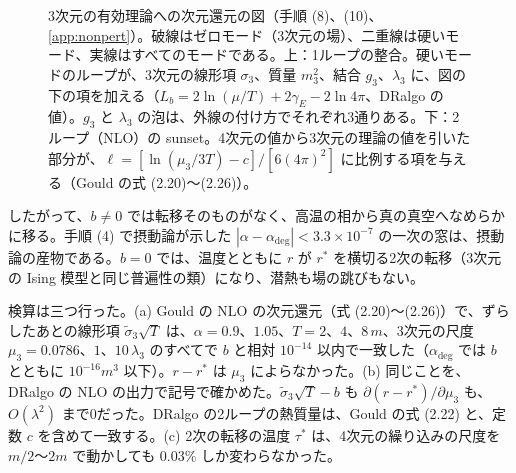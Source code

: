 \documentclass[a4paper,10pt]{ltjsarticle}
\begin{document}
\begin{figure}[tbp]
\caption{3次元の有効理論への次元還元の図（手順 (8)、(10)、\ref{app:nonpert}）。破線はゼロモード（3次元の場）、二重線は硬いモード、実線はすべてのモードである。上：1ループの整合。硬いモードのループが、3次元の線形項 $\sigma_3$、質量 $m_3^2$、結合 $g_3$、$\lambda_3$ に、図の下の項を加える（$L_b=2\ln(\mu/T)+2\gamma_E-2\ln4\pi$、DRalgo の値）。$g_3$ と $\lambda_3$ の泡は、外線の付け方でそれぞれ3通りある。下：2ループ（NLO）の sunset。4次元の値から3次元の理論の値を引いた部分が、$\ell=[\ln(\mu_3/3T)-c]/[6(4\pi)^2]$ に比例する項を与える（Gould の式 (2.20)〜(2.26)）。}
\label{fig:dr}
\end{figure}

したがって、$b\ne0$ では転移そのものがなく、高温の相から真の真空へなめらかに移る。手順 (4) で摂動論が示した $|\alpha-\alpha_{\mathrm{deg}}|<3.3\times10^{-7}$ の一次の窓は、摂動論の産物である。$b=0$ では、温度とともに $r$ が $r^*$ を横切る2次の転移（3次元の Ising 模型と同じ普遍性の類）になり、潜熱も場の跳びもない。

検算は三つ行った。(a) Gould の NLO の次元還元（式 (2.20)〜(2.26)）で、ずらしたあとの線形項 $\tilde\sigma_3\sqrt T$ は、$\alpha=0.9$、$1.05$、$T=2$、$4$、$8\,m$、3次元の尺度 $\mu_3=0.0786$、$1$、$10\,\lambda_3$ のすべてで $b$ と相対 $10^{-14}$ 以内で一致した（$\alpha_{\mathrm{deg}}$ では $b$ とともに $10^{-16}m^3$ 以下）。$r-r^*$ は $\mu_3$ によらなかった。(b) 同じことを、DRalgo の NLO の出力で記号で確かめた。$\tilde\sigma_3\sqrt T-b$ も $\partial(r-r^*)/\partial\mu_3$ も、$O(\lambda^2)$ まで0だった。DRalgo の2ループの熱質量は、Gould の式 (2.22) と、定数 $c$ を含めて一致する。(c) 2次の転移の温度 $\tau^*$ は、4次元の繰り込みの尺度を $m/2$〜$2m$ で動かしても $0.03\%$ しか変わらなかった。
\end{document}
